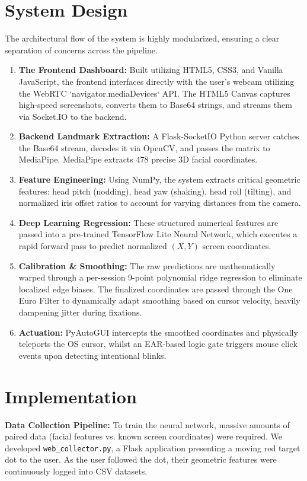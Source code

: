 \documentclass[12pt,a4paper]{report}
\begin{document}
\section{System Design}
The architectural flow of the system is highly modularized, ensuring a clear separation of concerns across the pipeline.
\begin{enumerate}
    \item \textbf{The Frontend Dashboard:} Built utilizing HTML5, CSS3, and Vanilla JavaScript, the frontend interfaces directly with the user's webcam utilizing the WebRTC `navigator.mediaDevices` API. The HTML5 Canvas captures high-speed screenshots, converts them to Base64 strings, and streams them via Socket.IO to the backend.
    \item \textbf{Backend Landmark Extraction:} A Flask-SocketIO Python server catches the Base64 stream, decodes it via OpenCV, and passes the matrix to MediaPipe. MediaPipe extracts 478 precise 3D facial coordinates.
    \item \textbf{Feature Engineering:} Using NumPy, the system extracts critical geometric features: head pitch (nodding), head yaw (shaking), head roll (tilting), and normalized iris offset ratios to account for varying distances from the camera.
    \item \textbf{Deep Learning Regression:} These structured numerical features are passed into a pre-trained TensorFlow Lite Neural Network, which executes a rapid forward pass to predict normalized $(X, Y)$ screen coordinates.
    \item \textbf{Calibration \& Smoothing:} The raw predictions are mathematically warped through a per-session 9-point polynomial ridge regression to eliminate localized edge biases. The finalized coordinates are passed through the One Euro Filter to dynamically adapt smoothing based on cursor velocity, heavily dampening jitter during fixations.
    \item \textbf{Actuation:} PyAutoGUI intercepts the smoothed coordinates and physically teleports the OS cursor, whilst an EAR-based logic gate triggers mouse click events upon detecting intentional blinks.
\end{enumerate}

\section{Implementation}
\textbf{Data Collection Pipeline:} To train the neural network, massive amounts of paired data (facial features vs. known screen coordinates) were required. We developed \texttt{web\_collector.py}, a Flask application presenting a moving red target dot to the user. As the user followed the dot, their geometric features were continuously logged into CSV datasets.
\end{document}
